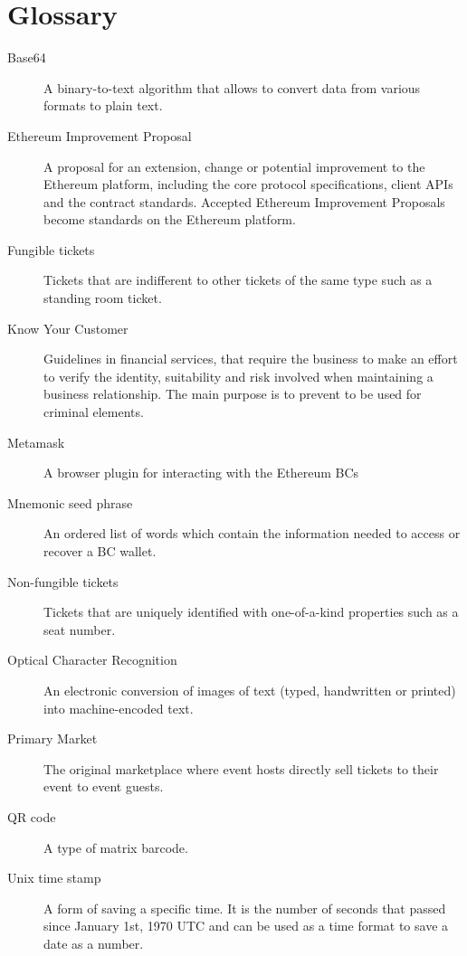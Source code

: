 \chapter*{Glossary}


\begin{description}
  \item[Base64] A binary-to-text algorithm that allows to convert data from various formats to plain text.
  \item[Ethereum Improvement Proposal] A proposal for an extension, change or potential improvement to the Ethereum platform, including the core protocol specifications, client APIs and the contract standards. Accepted Ethereum Improvement Proposals become standards on the Ethereum platform.
  \item[Fungible tickets] Tickets that are indifferent to other tickets of the same type such as a standing room ticket.
  \item[Know Your Customer] Guidelines in financial services, that require the business to make an effort to verify the identity, suitability and risk involved when maintaining a business relationship. The main purpose is to prevent to be used for criminal elements.
  \item[Metamask] A browser plugin for interacting with the Ethereum BCs
  \item[Mnemonic seed phrase] An ordered list of words which contain the information needed to access or recover a BC wallet.
  \item[Non-fungible tickets] Tickets that are uniquely identified with one-of-a-kind properties such as a seat number.
  \item[Optical Character Recognition] An electronic conversion of images of text (typed, handwritten or printed) into machine-encoded text.
  \item[Primary Market] The original marketplace where event hosts directly sell tickets to their event to event guests.
  \item[QR code] A type of matrix barcode.
  \item[Unix time stamp] A form of saving a specific time. It is the number of seconds that passed since January 1st, 1970 UTC and can be used as a time format to save a date as a number.
\end{description}
